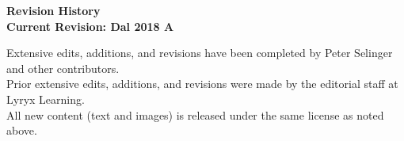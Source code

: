 \thispagestyle{plain}


\setlength{\parskip}{0pt}

\begin{center}
  \fontsize{14pt}{16pt}\selectfont\textcolor{titletextcolour}{\textbf{Revision History \\ \smallskip  Current Revision: Dal 2018 A }}
\end{center}

{\footnotesize

  \begin{center}
    Extensive edits, additions, and revisions have been completed by
    Peter Selinger and other contributors. \\
    Prior extensive edits, additions, and revisions were made by the
    editorial staff at Lyryx Learning. \\
    All new content (text and images) is released under the same
    license as noted above.
  \end{center}

}
